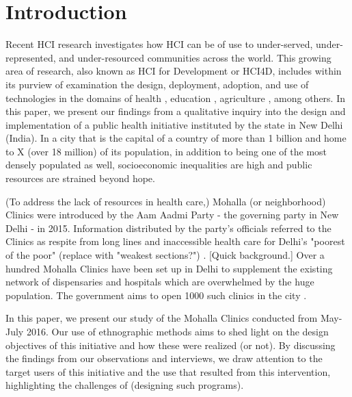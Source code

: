 \section{Introduction}
\begin{comment}
High level overview of the phenomenon you are studying. Should be something the reader can immediately get behind and hook themselves to. 
Now carry the reader through your flow. Draw their focus to the more narrow context in which you did your work.  
“In this paper, we focus on…” Give the high level description of your research.
“This paper is structured as follows.” Give the outline. When you mention the discussion, also mention the main findings of the discussion.
\end{comment}

\textcolor{red}{}
Recent HCI research investigates how HCI can be of use to under-served, under-represented, and under-resourced communities across the world. This growing area of research, also known as HCI for Development or HCI4D, includes within its purview of examination the design, deployment, adoption, and use of technologies in the domains of health \cite{PH-CHI;TP}, education \cite{Kam}, agriculture \cite{Patel}, among others. In this paper, we present our findings from a qualitative inquiry into the design and implementation of a public health initiative instituted by the state in New Delhi (India). In a city that is the capital of a country of more than 1 billion and home to X (over 18 million) of its population, in addition to being one of the most densely populated as well, socioeconomic inequalities are high and public resources are strained beyond hope. 

(To address the lack of resources in health care,) Mohalla (or neighborhood) Clinics were introduced by the Aam Aadmi Party - the governing party in New Delhi - in 2015. Information distributed by the party's officials referred to the Clinics as respite from long lines and inaccessible health care for Delhi's "poorest of the poor" (replace with "weakest sections?") \cite{AAPpressrelease}. [Quick background.] 	Over a hundred Mohalla Clinics have been set up in Delhi to supplement the existing network of dispensaries and hospitals which are overwhelmed by the huge population. The government aims to open 1000 such clinics in the city \cite{?}.

In this paper, we present our study of the Mohalla Clinics conducted from May-July 2016. Our use of ethnographic methods aims to shed light on the design objectives of this initiative and how these were realized (or not). By discussing the findings from our observations and interviews, we draw attention to the target users of this initiative and the use that resulted from this intervention, highlighting the challenges of (designing such programs).

